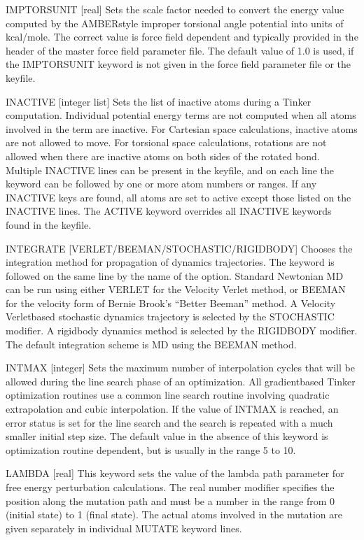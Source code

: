 \documentclass[letterpaper,11pt,english]{sphinxmanual}
\begin{document}
IMPTORSUNIT {[}real{]}     Sets the scale factor needed to convert the energy value computed by the AMBER\sphinxhyphen{}style improper torsional angle potential into units of kcal/mole. The correct value is force field dependent and typically provided in the header of the master force field parameter file. The default value of 1.0 is used, if the IMPTORSUNIT keyword is not given in the force field parameter file or the keyfile.

INACTIVE {[}integer list{]}     Sets the list of inactive atoms during a Tinker computation. Individual potential energy terms are not computed when all atoms involved in the term are inactive. For Cartesian space calculations, inactive atoms are not allowed to move. For torsional space calculations, rotations are not allowed when there are inactive atoms on both sides of the rotated bond. Multiple INACTIVE lines can be present in the keyfile, and on each line the keyword can be followed by one or more atom numbers or ranges. If any INACTIVE keys are found, all atoms are set to active except those listed on the INACTIVE lines. The ACTIVE keyword overrides all INACTIVE keywords found in the keyfile.

INTEGRATE {[}VERLET/BEEMAN/STOCHASTIC/RIGIDBODY{]}     Chooses the integration method for propagation of dynamics trajectories. The keyword is followed on the same line by the name of the option. Standard Newtonian MD can be run using either VERLET for the Velocity Verlet method, or BEEMAN for the velocity form of Bernie Brook’s “Better Beeman” method. A Velocity Verlet\sphinxhyphen{}based stochastic dynamics trajectory is selected by the STOCHASTIC modifier. A rigid\sphinxhyphen{}body dynamics method is selected by the RIGIDBODY modifier. The default integration scheme is MD using the BEEMAN method.

INTMAX {[}integer{]}     Sets the maximum number of interpolation cycles that will be allowed during the line search phase of an optimization. All gradient\sphinxhyphen{}based Tinker optimization routines use a common line search routine involving quadratic extrapolation and cubic interpolation. If the value of INTMAX is reached, an error status is set for the line search and the search is repeated with a much smaller initial step size. The default value in the absence of this keyword is optimization routine dependent, but is usually in the range 5 to 10.

LAMBDA {[}real{]}     This keyword sets the value of the lambda path parameter for free energy perturbation calculations. The real number modifier specifies the position along the mutation path and must be a number in the range from 0 (initial state) to 1 (final state). The actual atoms involved in the mutation are given separately in individual MUTATE keyword lines.
\end{document}
